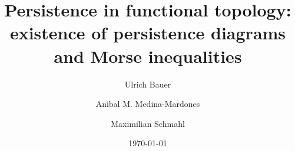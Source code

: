 \documentclass{amsart}
\title[Persistence in functional topology]{Persistence in functional topology:
existence of
persistence diagrams
and
Morse inequalities
}
\author[U.~Bauer]{Ulrich Bauer}
\author[A.~Medina-Mardones]{Anibal M. Medina-Mardones}
\author[M.~Schmahl]{Maximilian Schmahl}
\date{\today}
\begin{document}
	
	\maketitle
	
	
	
	
	
	\appendix
	
	
	\sloppy
	\printbibliography
	\todos
\end{document}
